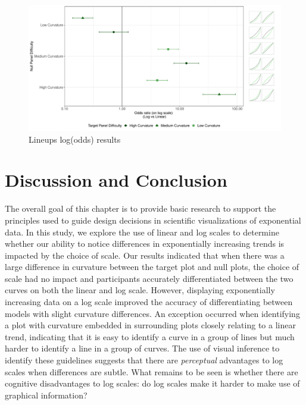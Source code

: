 \documentclass[print]{nuthesis}
\begin{document}
\begin{figure}

{\centering \includegraphics[width=\linewidth]{thesis_files/figure-latex/odds-ratio-plot-1} 

}

\caption{Lineups log(odds) results}\label{fig:odds-ratio-plot}
\end{figure}

\hypertarget{discussion-and-conclusion}{%
\section{Discussion and Conclusion}\label{discussion-and-conclusion}}

The overall goal of this chapter is to provide basic research to support the principles used to guide design decisions in scientific visualizations of exponential data.
In this study, we explore the use of linear and log scales to determine whether our ability to notice differences in exponentially increasing trends is impacted by the choice of scale.
Our results indicated that when there was a large difference in curvature between the target plot and null plots, the choice of scale had no impact and participants accurately differentiated between the two curves on both the linear and log scale.
However, displaying exponentially increasing data on a log scale improved the accuracy of differentiating between models with slight curvature differences.
An exception occurred when identifying a plot with curvature embedded in surrounding plots closely relating to a linear trend, indicating that it is easy to identify a curve in a group of lines but much harder to identify a line in a group of curves.
The use of visual inference to identify these guidelines suggests that there are \emph{perceptual} advantages to log scales when differences are subtle.
What remains to be seen is whether there are cognitive disadvantages to log scales: do log scales make it harder to make use of graphical information?
\end{document}
